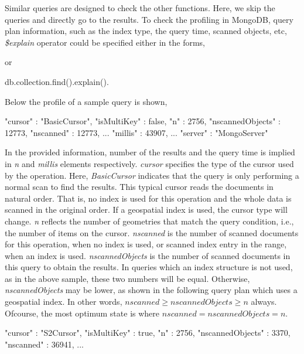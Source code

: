 \documentclass[a4paper,12pt]{article}
\begin{document}
Similar queries are designed to check the other functions. Here, we skip the queries and directly go to the results. To check the profiling in MongoDB, query plan information, such as the index type, the query time, scanned objects, etc, \textit{\$explain} operator could be specified either in the forms,
\vspace{10px}
 or 
 \begin{fakeJSON}
db.collection.find().explain().
 \end{fakeJSON}
\vspace{10px}
Below the profile of a sample query is shown,
\vspace{10px}
\begin{fakeJSON}
"cursor" : "BasicCursor",
"isMultiKey" : false,
"n" : 2756,
"nscannedObjects" : 12773,
"nscanned" : 12773,
...
"millis" : 43907,
...
"server" : "MongoServer"
\end{fakeJSON}
\vspace{10px}

In the provided information, number of the results and the query time is implied in \textit{n} and \textit{millis} elements respectively. \textit{cursor} specifies the type of the cursor used by the operation. Here, \textit{BasicCursor} indicates that the query is only performing a normal scan to find the results.  This typical cursor reads the documents in natural order. That is, no index is used for this operation and the whole data is scanned in the original order. If a geospatial index is used, the cursor type will change. \textit{n} reflects the number of geometries that match the query condition, i.e., the number of items on the cursor. \textit{nscanned} is the number of scanned documents for this operation, when no index is used, or scanned index entry in the range, when an index is used. \textit{nscannedObjects} is the number of scanned documents in this query to obtain the results. In queries which an index structure is not used, as in the above sample, these two numbers will be equal. Otherwise, \textit{nscannedObjects} may be lower, as shown in the following query plan which uses a geospatial index. 
In other words, $nscanned\geq nscannedObjects\geq n$ always. Ofcourse, the most optimum state is where $nscanned=nscannedObjects=n$. 
\vspace{10px}
\begin{fakeJSON}
"cursor" : "S2Cursor",
"isMultiKey" : true,
"n" : 2756,
"nscannedObjects" : 3370,
"nscanned" : 36941,
...
\end{fakeJSON}
\vspace{10px}
\end{document}
